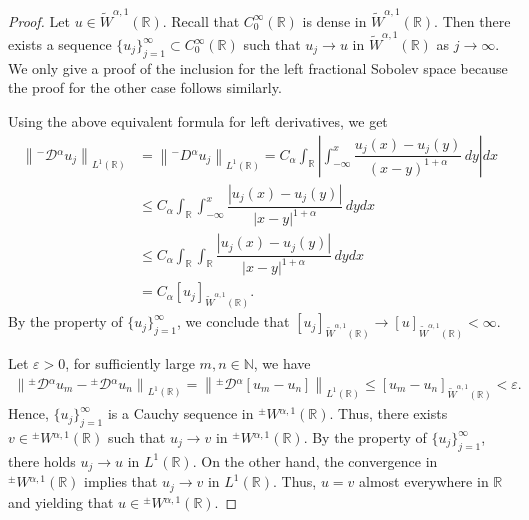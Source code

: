 \documentclass[leqno,final]{siamltex}
\numberwithin{equation}{section}
\newcommand{\eps}{\varepsilon}
\renewcommand{\(}{\bigl(}
\renewcommand{\)}{\bigr)}
\newcommand{\R}{\mathbb{R}}
\newcommand{\N}{\mathbb{N}}
\begin{document}
        \begin{proof}
            Let $u \in \widetilde{W}^{\alpha,1}(\R)$. Recall that $C^{\infty}_{0}(\R)$ is dense in $\widetilde{W}^{\alpha,1}(\R)$. Then 
            there exists a sequence $\{u_j\}_{j=1}^{\infty} \subset C^{\infty}_{0}(\R)$ such that $u_j \rightarrow u$ 
            in $\widetilde{W}^{\alpha,1}(\R)$ as $j \rightarrow \infty$. We only give a proof of the inclusion 
            for the left fractional Sobolev space because the proof for the other case follows similarly.  
            
            Using the above equivalent formula for left derivatives, we get 
            \begin{align*}
                \left\| {^{-}}{\mathcal{D}}{^{\alpha}}u_j \right\|_{L^{1}(\R)} &= \left\|{^{-}}{D}{^{\alpha}} u_j \right\|_{L^{1}(\R)} 
                = C_\alpha \int_{\R} \left|\int_{-\infty}^{x} \dfrac{u_j (x) - u_j(y)}{(x-y)^{1+\alpha}}\,dy \right|dx \\ 
                &\leq C_\alpha \int_{\R} \int_{-\infty}^{x} \dfrac{|u_j(x) - u_j(y)|}{|x-y|^{1+\alpha}}\,dydx \\
                &\leq C_\alpha \int_{\R} \int_{\R} \dfrac{|u_j(x) - u_j(y)|}{|x-y|^{1+\alpha}}\,dydx  \\
                &= C_\alpha \left[u_j \right]_{\widetilde{W}^{\alpha,1}(\R)}.
            \end{align*}
            By the property of $\{u_j\}_{j=1}^{\infty}$, we conclude that $\left[ u_j \right]_{\widetilde{W}^{\alpha,1}(\R)} \rightarrow [u]_{\widetilde{W}^{\alpha,1}(\R)} < \infty$. 

            Let $\eps > 0$, for sufficiently large $m,n \in \N$, we have
            \begin{align*}
                \left\|{^{\pm}}{\mathcal{D}}{^{\alpha}} u_m - {^{\pm}}{\mathcal{D}}{^{\alpha}} u_n \right\|_{L^{1}(\R)} = \left\|{^{\pm}}{\mathcal{D}}{^{\alpha}} \left[u_m - u_n \right]\right\|_{L^{1}(\R)}  
                \leq \left[u_m - u_n \right]_{\widetilde{W}^{\alpha,1}(\R)}  
                <\eps.
            \end{align*}
            Hence, $\{u_j\}_{j=1}^{\infty}$ is a Cauchy sequence in ${^{\pm}}{W}{^{\alpha,1}}(\R)$. Thus, 
            there exists $v \in {^{\pm}}{W}{^{\alpha,1}}(\R)$ such that $u_j \rightarrow v$ 
            in ${^{\pm}}{W}{^{\alpha,1}}(\R)$. By the property of $\{u_j\}_{j=1}^{\infty}$, there holds 
            $u_j \rightarrow u$ in $L^{1}(\R)$. On the other hand, the convergence in ${^{\pm}}{W}{^{\alpha,1}}(\R)$ implies that $u_j \rightarrow v$ in $L^{1}(\R)$.
            Thus, $u=v$ almost everywhere in $\R$ and yielding that $u \in {^{\pm}}{W}{^{\alpha,1}}(\R)$. 
        \end{proof}
    
\end{document}
